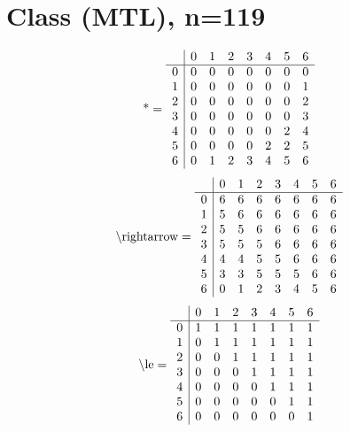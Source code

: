 \documentclass[11pt]{article}
\begin{document}
\section{Class (MTL), n=119}
\[\text{*} = 
\begin{array}{r | r r r r r r r}
 & 0 & 1 & 2 & 3 & 4 & 5 & 6 \\ \hline
0 & 0 & 0 & 0 & 0 & 0 & 0 & 0 \\
1 & 0 & 0 & 0 & 0 & 0 & 0 & 1 \\
2 & 0 & 0 & 0 & 0 & 0 & 0 & 2 \\
3 & 0 & 0 & 0 & 0 & 0 & 0 & 3 \\
4 & 0 & 0 & 0 & 0 & 0 & 2 & 4 \\
5 & 0 & 0 & 0 & 0 & 2 & 2 & 5 \\
6 & 0 & 1 & 2 & 3 & 4 & 5 & 6 \\
\end{array}
\]
\[\text{\textbackslash rightarrow} = 
\begin{array}{r | r r r r r r r}
 & 0 & 1 & 2 & 3 & 4 & 5 & 6 \\ \hline
0 & 6 & 6 & 6 & 6 & 6 & 6 & 6 \\
1 & 5 & 6 & 6 & 6 & 6 & 6 & 6 \\
2 & 5 & 5 & 6 & 6 & 6 & 6 & 6 \\
3 & 5 & 5 & 5 & 6 & 6 & 6 & 6 \\
4 & 4 & 4 & 5 & 5 & 6 & 6 & 6 \\
5 & 3 & 3 & 5 & 5 & 5 & 6 & 6 \\
6 & 0 & 1 & 2 & 3 & 4 & 5 & 6 \\
\end{array}
\]
\[\text{\textbackslash le} = 
\begin{array}{r | r r r r r r r}
 & 0 & 1 & 2 & 3 & 4 & 5 & 6 \\ \hline
0 & 1 & 1 & 1 & 1 & 1 & 1 & 1 \\
1 & 0 & 1 & 1 & 1 & 1 & 1 & 1 \\
2 & 0 & 0 & 1 & 1 & 1 & 1 & 1 \\
3 & 0 & 0 & 0 & 1 & 1 & 1 & 1 \\
4 & 0 & 0 & 0 & 0 & 1 & 1 & 1 \\
5 & 0 & 0 & 0 & 0 & 0 & 1 & 1 \\
6 & 0 & 0 & 0 & 0 & 0 & 0 & 1 \\
\end{array}
\]
\end{document}
